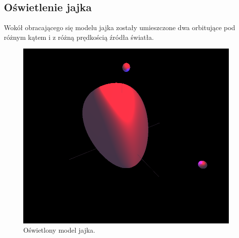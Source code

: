 \subsection{Oświetlenie jajka}
Wokół obracającego się modelu jajka zostały umieszczone dwa orbitujące pod różnym kątem i z różną prędkością źródła światła.
\begin{figure}[H]
    \centering
    \includegraphics[width=0.8\linewidth, trim={0cm 6cm 0cm 0.5cm},clip]{img/egg_4.png}
    \caption{Oświetlony model jajka.}
\end{figure}